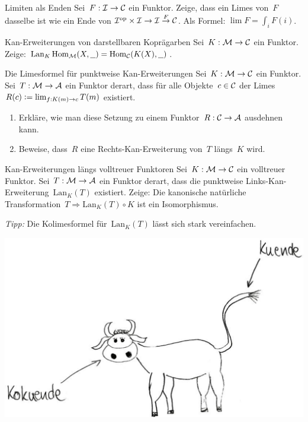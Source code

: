 \documentclass{uebblatt}
\begin{document}

\begin{aufgabe}{Limiten als Enden}
Sei~$F : \mathcal{I} \to \mathcal{C}$ ein Funktor. Zeige, dass ein Limes von~$F$ dasselbe ist wie ein
Ende von $\mathcal{I}^{\mathrm{op}} \times \mathcal{I} \to \mathcal{I} \stackrel{F}{\to} \mathcal{C}$. Als Formel: $\lim F =
\int_i F(i)$.
\end{aufgabe}

\begin{aufgabe}{Kan-Erweiterungen von darstellbaren Koprägarben}
Sei~$K : \mathcal{M} \to \mathcal{C}$ ein Funktor. Zeige:
$\operatorname{Lan}_K \mathrm{Hom}_{\mathcal{M}}(X, \underline{\ \ }) =
  \mathrm{Hom}_{\mathcal{C}}(K(X), \underline{\ \ })$.
\end{aufgabe}

\begin{aufgabe}{Die Limesformel für punktweise Kan-Erweiterungen}
Sei~$K : \mathcal{M} \to \mathcal{C}$ ein Funktor. Sei~$T : \mathcal{M} \to \mathcal{A}$ ein Funktor derart, dass
für alle Objekte~$c \in \mathcal{C}$ der Limes~$R(c) \vcentcolon= \lim_{f:K(m) \to c} T(m)$
existiert.
\begin{enumerate}
\item Erkläre, wie man diese Setzung zu einem Funktor~$R : \mathcal{C} \to \mathcal{A}$ ausdehnen
kann.
\item Beweise, dass~$R$ eine Rechts-Kan-Erweiterung von~$T$ längs~$K$ wird.
\end{enumerate}
\end{aufgabe}

\begin{aufgabe}{Kan-Erweiterungen längs volltreuer Funktoren}
Sei~$K : \mathcal{M} \to \mathcal{C}$ ein volltreuer Funktor. Sei~$T : \mathcal{M} \to \mathcal{A}$ ein Funktor
derart, dass die punktweise Links-Kan-Erweiterung~$\mathrm{Lan}_K(T)$
existiert. Zeige: Die kanonische natürliche Transformation~$T \Rightarrow
\mathrm{Lan}_K(T) \circ K$ ist ein Isomorphismus.

{\tiny\emph{Tipp:} Die Kolimesformel für~$\mathrm{Lan}_K(T)$ lässt sich stark
vereinfachen.\par}
\end{aufgabe}

\includegraphics{images/kuende}
\end{document}
